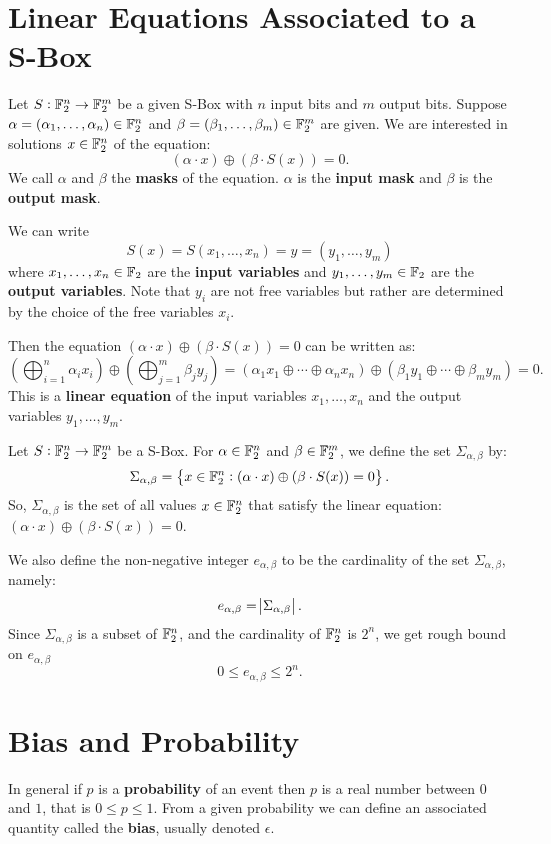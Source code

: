 \section{Linear Equations Associated to a S-Box}
Let $S:\mathbb{F}_2^n\to\mathbb{F}_2^m$ be a given S-Box with $n$ input bits and $m$ output bits. Suppose $\alpha=(\alpha_1,\dots,\alpha_n)\in\mathbb{F}_2^n$ and $\beta=(\beta_1,\dots,\beta_m)\in\mathbb{F}_2^m$ are given. We are interested in solutions $x\in\mathbb{F}_2^n$ of the equation: \[
(\alpha\cdot x)\oplus(\beta\cdot S(x)) = 0.
\] We call $\alpha$ and $\beta$ the \textbf{masks} of the equation. $\alpha$ is the \textbf{input mask} and $\beta$ is the \textbf{output mask}.

We can write \[
S(x)=S(x_1,\dots, x_n)=y=(y_1,\dots, y_m)
\] where $x_1,\dots,x_n\in\mathbb{F}_2$ are the \textbf{input variables} and $y_1,\dots,y_m\in\mathbb{F}_2$ are the \textbf{output variables}. Note that $y_i$ are not free variables but rather are determined by the choice of the free variables $x_i$.

Then the equation $(\alpha\cdot x)\oplus(\beta\cdot S(x))=0$ can be written as: \[
\left(\bigoplus_{i=1}^n\alpha_ix_i\right)\oplus\left(\bigoplus_{j=1}^m\beta_jy_j\right)=\left(\alpha_1x_1\oplus\cdots\oplus\alpha_nx_n\right)\oplus\left(\beta_1y_1\oplus\cdots\oplus\beta_my_m\right)=0.
\] This is a \textbf{linear equation} of the input variables $x_1,\dots,x_n$ and the output variables $y_1,\dots,y_m$.

Let $S:\mathbb{F}_2^n\to\mathbb{F}_2^m$ be a S-Box. For $\alpha\in\mathbb{F}_2^n$ and $\beta\in\mathbb{F}_2^m$, we define the set $\Sigma_{\alpha,\beta}$ by: \[
\Sigma_{\alpha,\beta}=\set{x\in\mathbb{F}_2^n:(\alpha\cdot x)\oplus(\beta\cdot S(x))=0}.
\] So, $\Sigma_{\alpha,\beta}$ is the set of all values $x\in\mathbb{F}_2^n$ that satisfy the linear equation: $(\alpha\cdot x)\oplus(\beta\cdot S(x))=0$.

We also define the non-negative integer $e_{\alpha,\beta}$ to be the cardinality of the set $\Sigma_{\alpha,\beta}$, namely: \[
e_{\alpha,\beta}=\abs{\Sigma_{\alpha,\beta}}.
\] Since $\Sigma_{\alpha,\beta}$ is a subset of $\mathbb{F}_2^n$, and the cardinality of $\mathbb{F}_2^n$ is $2^n$, we get rough bound on $e_{\alpha,\beta}$ \[
0\leq e_{\alpha,\beta}\leq 2^n.
\]

\newpage
\section{Bias and Probability}
In general if $p$ is a \textbf{probability} of an event then $p$ is a real number between $0$ and $1$, that is $0\leq p\leq 1$. From a given probability we can define an associated quantity called the \textbf{bias}, usually denoted $\epsilon$.

